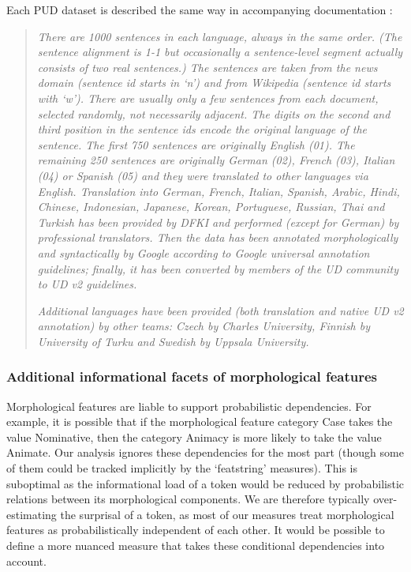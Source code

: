 \documentclass[USenglish]{article}
\begin{document}
Each PUD dataset is described the same way in accompanying documentation \citep{UD_2.14}:
\begin{quote}
    
\textit{
There are 1000 sentences in each language, always in the same order. (The sentence alignment is 1-1 but occasionally a sentence-level segment actually consists of two real sentences.) The sentences are taken from the news domain (sentence id starts in ‘n’) and from Wikipedia (sentence id starts with ‘w’). There are usually only a few sentences from each document, selected randomly, not necessarily adjacent. The digits on the second and third position in the sentence ids encode the original language of the sentence. The first 750 sentences are originally English (01). The remaining 250 sentences are originally German (02), French (03), Italian (04) or Spanish (05) and they were translated to other languages via English. Translation into German, French, Italian, Spanish, Arabic, Hindi, Chinese, Indonesian, Japanese, Korean, Portuguese, Russian, Thai and Turkish has been provided by DFKI and performed (except for German) by professional translators. Then the data has been annotated morphologically and syntactically by Google according to Google universal annotation guidelines; finally, it has been converted by members of the UD community to UD v2 guidelines.}

\textit{
Additional languages have been provided (both translation and native UD v2 annotation) by other teams: Czech by Charles University, Finnish by University of Turku and Swedish by Uppsala University.}

\end{quote}


\subsubsection{Additional informational facets of morphological features}
\label{caveat_conditional_order}
Morphological features are liable to support probabilistic dependencies.
For example, it is possible that if the morphological feature category Case takes the value Nominative, then the category Animacy is more likely to take the value Animate.
Our analysis ignores these dependencies for the most part (though some of them could be tracked implicitly by the `featstring' measures).
This is suboptimal as the informational load of a token would be reduced by probabilistic relations between its morphological components.
We are therefore typically over-estimating the surprisal of a token, as most of our measures treat morphological features as probabilistically independent of each other.
It would be possible to define a more nuanced measure that takes these conditional dependencies into account.
\end{document}
